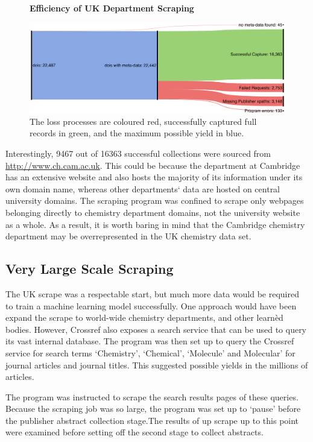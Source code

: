\begin{figure}[H]
    \centering
    \textbf{Efficiency of UK Department Scraping}\par\medskip
    \includegraphics[scale=0.07]{Data_Acquisition/uk_sankey.png}
    \caption{The loss processes are coloured red, successfully captured full records in green, and the maximum possible yield in blue.}
     \label{fig:UKSANK}
\end{figure}

Interestingly, 9467 out of 16363 successful collections were sourced from \url{http://www.ch.cam.ac.uk}. This could be because the department at Cambridge has an extensive website and also hosts the majority of its information under its own domain name, whereas other departments` data are hosted on central university domains. The scraping program was confined to scrape only webpages belonging directly to chemistry department domains, not the university website as a whole. As a result, it is worth baring in mind that the Cambridge chemistry department may be overrepresented in the UK chemistry data set.

\subsection{Very Large Scale Scraping}
\label{sec:CROSSREFSCRAPE}
The UK scrape was a respectable start, but much more data would be required to train a machine learning model successfully. One approach would have been expand the scrape to world-wide chemistry departments, and other learn\`{e}d bodies. However, Crossref also exposes a search service that can be used to query its vast internal database. The program was then set up to query the Crossref service for search terms `Chemistry', `Chemical', `Molecule' and Molecular' for journal articles and journal titles. This suggested possible yields in the millions of articles. 

The program was instructed to scrape the search results pages of these queries. Because the scraping job was so large, the program was set up to `pause' before the publisher abstract collection stage.The results of up scrape up to this point were examined before setting off the second stage to collect abstracts.

